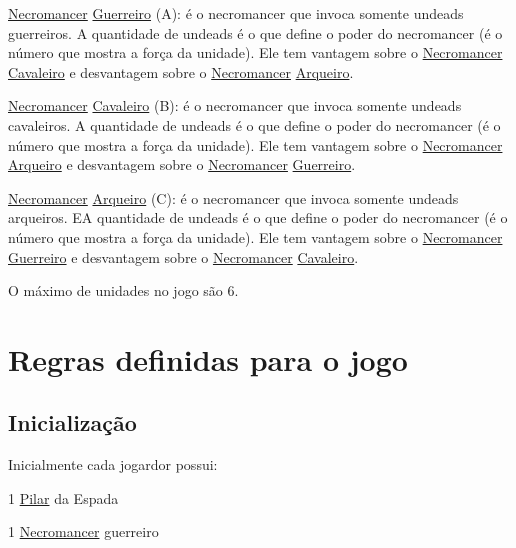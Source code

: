 \begin{DoxyItemize}
\item \mbox{\hyperlink{class_necromancer}{Necromancer}} \mbox{\hyperlink{class_guerreiro}{Guerreiro}} (A)\+: é o necromancer que invoca somente undeads guerreiros. A quantidade de undeads é o que define o poder do necromancer (é o número que mostra a força da unidade). Ele tem vantagem sobre o \mbox{\hyperlink{class_necromancer}{Necromancer}} \mbox{\hyperlink{class_cavaleiro}{Cavaleiro}} e desvantagem sobre o \mbox{\hyperlink{class_necromancer}{Necromancer}} \mbox{\hyperlink{class_arqueiro}{Arqueiro}}.
\item \mbox{\hyperlink{class_necromancer}{Necromancer}} \mbox{\hyperlink{class_cavaleiro}{Cavaleiro}} (B)\+: é o necromancer que invoca somente undeads cavaleiros. A quantidade de undeads é o que define o poder do necromancer (é o número que mostra a força da unidade). Ele tem vantagem sobre o \mbox{\hyperlink{class_necromancer}{Necromancer}} \mbox{\hyperlink{class_arqueiro}{Arqueiro}} e desvantagem sobre o \mbox{\hyperlink{class_necromancer}{Necromancer}} \mbox{\hyperlink{class_guerreiro}{Guerreiro}}.
\item \mbox{\hyperlink{class_necromancer}{Necromancer}} \mbox{\hyperlink{class_arqueiro}{Arqueiro}} (C)\+: é o necromancer que invoca somente undeads arqueiros. EA quantidade de undeads é o que define o poder do necromancer (é o número que mostra a força da unidade). Ele tem vantagem sobre o \mbox{\hyperlink{class_necromancer}{Necromancer}} \mbox{\hyperlink{class_guerreiro}{Guerreiro}} e desvantagem sobre o \mbox{\hyperlink{class_necromancer}{Necromancer}} \mbox{\hyperlink{class_cavaleiro}{Cavaleiro}}.
\end{DoxyItemize}

O máximo de unidades no jogo são 6.

\section*{Regras definidas para o jogo}

\subsection*{Inicialização}

Inicialmente cada jogardor possui\+:
\begin{DoxyItemize}
\item 1 \mbox{\hyperlink{class_pilar}{Pilar}} da Espada
\item 1 \mbox{\hyperlink{class_necromancer}{Necromancer}} guerreiro
\end{DoxyItemize}

